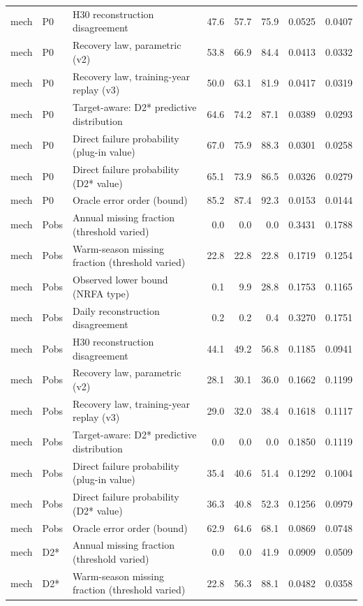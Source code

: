 \begin{table}
{\begin{tabular}{lllrrrrr}
mech & P0 & H30 reconstruction disagreement & 47.6 & 57.7 & 75.9 & 0.0525 & 0.0407 \\
mech & P0 & Recovery law, parametric (v2) & 53.8 & 66.9 & 84.4 & 0.0413 & 0.0332 \\
mech & P0 & Recovery law, training-year replay (v3) & 50.0 & 63.1 & 81.9 & 0.0417 & 0.0319 \\
mech & P0 & Target-aware: D2* predictive distribution & 64.6 & 74.2 & 87.1 & 0.0389 & 0.0293 \\
mech & P0 & Direct failure probability (plug-in value) & 67.0 & 75.9 & 88.3 & 0.0301 & 0.0258 \\
mech & P0 & Direct failure probability (D2* value) & 65.1 & 73.9 & 86.5 & 0.0326 & 0.0279 \\
mech & P0 & Oracle error order (bound) & 85.2 & 87.4 & 92.3 & 0.0153 & 0.0144 \\
mech & Pobs & Annual missing fraction (threshold varied) & 0.0 & 0.0 & 0.0 & 0.3431 & 0.1788 \\
mech & Pobs & Warm-season missing fraction (threshold varied) & 22.8 & 22.8 & 22.8 & 0.1719 & 0.1254 \\
mech & Pobs & Observed lower bound (NRFA type) & 0.1 & 9.9 & 28.8 & 0.1753 & 0.1165 \\
mech & Pobs & Daily reconstruction disagreement & 0.2 & 0.2 & 0.4 & 0.3270 & 0.1751 \\
mech & Pobs & H30 reconstruction disagreement & 44.1 & 49.2 & 56.8 & 0.1185 & 0.0941 \\
mech & Pobs & Recovery law, parametric (v2) & 28.1 & 30.1 & 36.0 & 0.1662 & 0.1199 \\
mech & Pobs & Recovery law, training-year replay (v3) & 29.0 & 32.0 & 38.4 & 0.1618 & 0.1117 \\
mech & Pobs & Target-aware: D2* predictive distribution & 0.0 & 0.0 & 0.0 & 0.1850 & 0.1119 \\
mech & Pobs & Direct failure probability (plug-in value) & 35.4 & 40.6 & 51.4 & 0.1292 & 0.1004 \\
mech & Pobs & Direct failure probability (D2* value) & 36.3 & 40.8 & 52.3 & 0.1256 & 0.0979 \\
mech & Pobs & Oracle error order (bound) & 62.9 & 64.6 & 68.1 & 0.0869 & 0.0748 \\
mech & D2* & Annual missing fraction (threshold varied) & 0.0 & 0.0 & 41.9 & 0.0909 & 0.0509 \\
mech & D2* & Warm-season missing fraction (threshold varied) & 22.8 & 56.3 & 88.1 & 0.0482 & 0.0358 \\

\end{tabular}}
\end{table}
